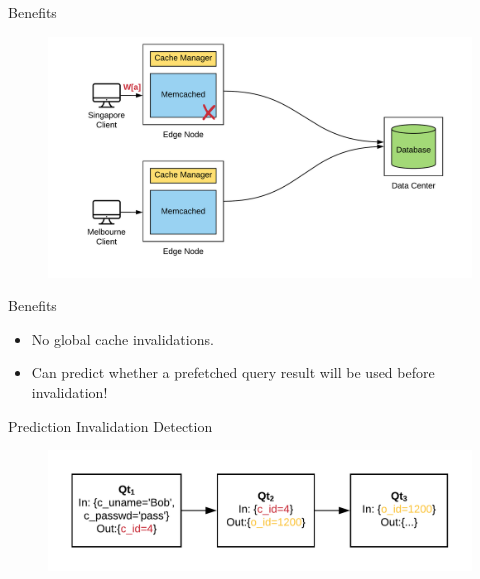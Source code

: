 \documentclass[10pt]{beamer}
\begin{document}
\begin{frame}{Benefits}
    \begin{figure}
        \center
        \hspace*{-1.5cm}
        \includegraphics[scale=0.17]{apollo_ec_upd}
    \end{figure}
\end{frame}

\begin{frame}[fragile]{Benefits}
    \begin{itemize}
        \item{No global cache invalidations.}
        \item{Can predict whether a prefetched query result will be used before invalidation!}
    \end{itemize}
\end{frame}

\begin{frame}[fragile]{Prediction Invalidation Detection}
    \begin{figure}
        \includegraphics[scale=0.22]{apollo_query_pipeline}
    \end{figure}
\end{frame}
\end{document}
